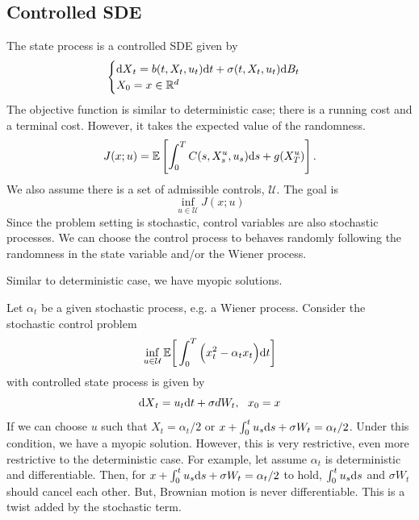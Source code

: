 \documentclass[11pt]{book}
\newcommand{\dd}{\text{\normalfont d}}
\newcommand{\dt}{\text{\normalfont d}t}
\newcommand{\ds}{\text{\normalfont d}s}
\newcommand{\dX}{\text{\normalfont d}X}
\begin{document}
\subsection{Controlled SDE}
The state process is a controlled SDE given by
\begin{equation}\label{eqn:state_process}
	\begin{cases}
	    {\dX}_t =b(t,X_t,u_t){{\dt}}+\sigma(t,X_t,u_t){\dd}B_t\\
     X_0=x\in\mathbb{R}^d
	\end{cases}
\end{equation}
The objective function is similar to deterministic case; there is a running cost and a terminal cost. However, it takes the expected value of the randomness.
\begin{equation}
J(x;u)=\mathbb{E}\left[\int_0^T C(s,X_s^u,u_s){{\ds}}+g(X_T^u)\right].
\end{equation}
We also assume there is a set of admissible controls, $\mathcal{U}$. The goal is
\[
\inf_{u\in\mathcal{U}}J(x;u)
\]
Since the problem setting is stochastic, control variables are also stochastic processes. We can choose the control process to behaves randomly following the randomness in the state variable and/or the Wiener process.

Similar to deterministic case, we have myopic solutions. 
\begin{eg}
Let $\alpha_t$ be a given stochastic process, e.g. a Wiener process. Consider the stochastic control problem
    \begin{equation}\label{simple_stoch_control}
        \inf_{u\in\mathcal{U}}\mathbb{E}\bigg[\int_0^T\Big(x_t^2 - \alpha_t x_t\Big) {\dt}\bigg]
    \end{equation}
with controlled state process is given by
\begin{equation}\label{dynamic_SDE_x}
    {\dX}_t =  u_t {{\dt}}+\sigma dW_t, ~~ x_0=x
\end{equation}
If we can choose $u$ such that $X_t=\alpha_t/2$ or $x+\int_0^tu_s\ds+\sigma W_t=\alpha_t/2$. Under this condition, we have a myopic solution. However, this is very restrictive, even more restrictive to the deterministic case. For example, let assume $\alpha_t$ is deterministic and differentiable. Then, for $x+\int_0^tu_s\ds+\sigma W_t=\alpha_t/2$ to hold, $\int_0^tu_s\ds$ and $\sigma W_t$ should cancel each other. But, Brownian motion is never differentiable. This is a twist added by the stochastic term.
\end{eg}
\end{document}
